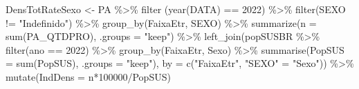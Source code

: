 \documentclass[
  letterpaper,
  DIV=11,
  numbers=noendperiod]{scrartcl}
\newenvironment{Shaded}{\begin{snugshade}}{\end{snugshade}}
\newcommand{\AttributeTok}[1]{\textcolor[rgb]{0.40,0.45,0.13}{#1}}
\newcommand{\DecValTok}[1]{\textcolor[rgb]{0.68,0.00,0.00}{#1}}
\newcommand{\FunctionTok}[1]{\textcolor[rgb]{0.28,0.35,0.67}{#1}}
\newcommand{\NormalTok}[1]{\textcolor[rgb]{0.00,0.23,0.31}{#1}}
\newcommand{\OtherTok}[1]{\textcolor[rgb]{0.00,0.23,0.31}{#1}}
\newcommand{\SpecialCharTok}[1]{\textcolor[rgb]{0.37,0.37,0.37}{#1}}
\newcommand{\StringTok}[1]{\textcolor[rgb]{0.13,0.47,0.30}{#1}}
\begin{document}
\begin{Shaded}
\begin{Highlighting}[]
\NormalTok{DensTotRateSexo }\OtherTok{\textless{}{-}}\NormalTok{ PA }\SpecialCharTok{\%\textgreater{}\%} \FunctionTok{filter}\NormalTok{ (}\FunctionTok{year}\NormalTok{(DATA) }\SpecialCharTok{==} \DecValTok{2022}\NormalTok{) }\SpecialCharTok{\%\textgreater{}\%} 
  \FunctionTok{filter}\NormalTok{(SEXO }\SpecialCharTok{!=} \StringTok{"Indefinido"}\NormalTok{) }\SpecialCharTok{\%\textgreater{}\%} 
  \FunctionTok{group\_by}\NormalTok{(FaixaEtr, SEXO) }\SpecialCharTok{\%\textgreater{}\%}
  \FunctionTok{summarize}\NormalTok{(}\AttributeTok{n =} \FunctionTok{sum}\NormalTok{(PA\_QTDPRO), }\AttributeTok{.groups =} \StringTok{"keep"}\NormalTok{) }\SpecialCharTok{\%\textgreater{}\%} 
  \FunctionTok{left\_join}\NormalTok{(popSUSBR }\SpecialCharTok{\%\textgreater{}\%} \FunctionTok{filter}\NormalTok{(ano }\SpecialCharTok{==} \DecValTok{2022}\NormalTok{) }\SpecialCharTok{\%\textgreater{}\%} \FunctionTok{group\_by}\NormalTok{(FaixaEtr, Sexo) }\SpecialCharTok{\%\textgreater{}\%} \FunctionTok{summarise}\NormalTok{(}\AttributeTok{PopSUS =} \FunctionTok{sum}\NormalTok{(PopSUS), }\AttributeTok{.groups =} \StringTok{"keep"}\NormalTok{), }\AttributeTok{by =} \FunctionTok{c}\NormalTok{(}\StringTok{"FaixaEtr"}\NormalTok{, }\StringTok{"SEXO"} \OtherTok{=} \StringTok{"Sexo"}\NormalTok{)) }\SpecialCharTok{\%\textgreater{}\%}
  \FunctionTok{mutate}\NormalTok{(}\AttributeTok{IndDens =}\NormalTok{ n}\SpecialCharTok{*}\DecValTok{100000}\SpecialCharTok{/}\NormalTok{PopSUS)}


\end{Highlighting}
\end{Shaded}
\end{document}
